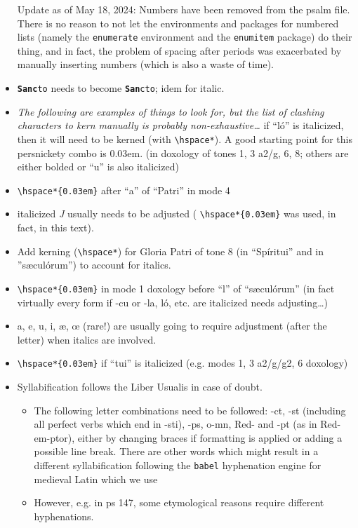 \documentclass[11pt]{article}
\begin{document}
\begin{itemize}
 Update as of May 18, 2024: Numbers have been removed from the psalm file. There is no reason to not let the environments and packages for numbered lists (namely the \verb|enumerate| environment and the \verb|enumitem| package) do their thing, and in fact, the problem of spacing after periods was exacerbated by manually inserting numbers (which is also a waste of time).
 \item \texttt{\textbf{Sanc}to} needs to become \texttt{\textbf{San}cto}; idem for italic.
 \item \emph{The following are examples of things to look for, but the list of clashing characters to kern manually is probably non-exhaustive…}
 if ``ló'' is italicized, then it will need to be kerned (with \verb|\hspace*|). A good starting point for this persnickety combo is 0.03em. (in doxology of tones 1, 3 a2/g, 6, 8; others are either bolded or ``u'' is also italicized)
  \item \verb|\hspace*{0.03em}| after ``a'' of ``Patri'' in mode 4
  \item italicized \hspace*{0.03em}\textit{J} usually needs to be adjusted ( \verb|\hspace*{0.03em}| was used, in fact, in this text).
  \item
  Add kerning (\verb|\hspace*|) for Gloria Patri of tone 8 (in ``Spíritui'' and in ''sæculórum'') to account for italics.
   \item  \verb|\hspace*{0.03em}| in mode 1 doxology before ``l'' of ``sæculórum'' (in fact virtually every form if -cu or -la, ló, etc. are italicized needs adjusting…)
   \item a, e, u, i, æ, œ (rare!) are usually going to require adjustment (after the letter) when italics are involved.
   \item  \verb|\hspace*{0.03em}| if ``tui'' is italicized (e.g. modes 1, 3 a2/g/g2, 6 doxology)
   \item
   Syllabification follows the Liber Usualis in case of doubt.
   \begin{itemize}
   \item
  The following letter combinations need to be followed: -ct, -st (including all perfect verbs which end in -sti), -ps, o-mn, Red- and -pt (as in Red-em-ptor), either by changing braces if formatting is applied or adding a possible line break. There are other words which might result in a different syllabification following the \verb|babel| hyphenation engine for medieval Latin which we use
  \item However, e.g. in ps 147, some etymological reasons require different hyphenations.
\end{itemize}
\end{itemize}
\end{document}

